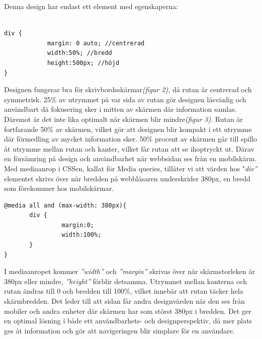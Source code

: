 \documentclass[11pt]{article}
\begin{document}
\vspace{1cm}
Denna design har endast ett element med egenskaperna:

\vspace{0.3cm}
\begin{verbatim}

div {	
	        margin: 0 auto; //centrerad
	        width:50%; //bredd
	        height:500px; //höjd
}
\end{verbatim}
\vspace{0.3cm}
Designen fungerar bra för skrivbordsskärmar\textit{(figur 2)}, då rutan är centrerad och symmetrisk. 25\% av utrymmet på var sida av rutan gör designen läsvänlig och användbart då fokusering sker i mitten av skärmen där information samlas. Däremot är det inte lika optimalt när skärmen blir mindre\textit{(figur 3)}. Rutan är fortfarande 50\% av skärmen, vilket gör att  designen blir kompakt i ett utrymme där förmedling av mycket information sker. 50\% procent av skärmen går till spillo åt utrymme mellan rutan och kanter, vilket får rutan att se ihoptryckt ut. Därav en försämring på design och användbarhet när webbsidan ses från en mobilskärm.
\newpage
Med mediaanrop i CSSen, kallat för Media queries, tillåter vi att värden hos "\textit{div”} elementet skrivs över när bredden på webbläsaren underskrider 380px, en bredd som förekommer hos mobilskärmar.

\vspace{0.5cm}
\begin{verbatim}
@media all and (max-width: 380px){
       div {
                margin:0;
                width:100%;
       }
}
\end{verbatim}
\vspace{0.5cm}

I mediaanropet kommer \textit{”width”} och \textit{”margin”} skrivas över när skärmstorleken är 380px eller mindre, \textit{”height”} förblir detsamma. Utrymmet mellan kanterna och rutan ändras till 0 och bredden till 100\%, vilket innebär att rutan täcker hela skärmbredden. Det leder till att sidan får andra designvärden när den ses från mobiler och andra enheter där skärmen har som störst 380px i bredden. Det ger en optimal lösning i både ett användbarhets- och designperspektiv, då mer plats ges åt information och gör att navigeringen blir simplare för en användare.
\end{document}
